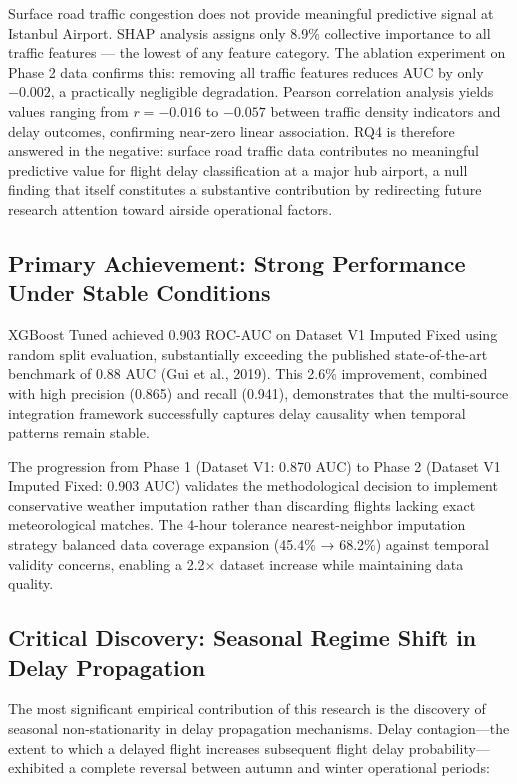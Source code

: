 \documentclass{report}
\begin{document}
Surface road traffic congestion does not provide meaningful predictive signal at Istanbul
Airport. SHAP analysis assigns only 8.9\% collective importance to all traffic features ---
the lowest of any feature category. The ablation experiment on Phase 2 data confirms this:
removing all traffic features reduces AUC by only $-0.002$, a practically negligible
degradation. Pearson correlation analysis yields values ranging from $r = -0.016$ to $-0.057$
between traffic density indicators and delay outcomes, confirming near-zero linear association.
RQ4 is therefore answered in the negative: surface road traffic data contributes no meaningful
predictive value for flight delay classification at a major hub airport, a null finding that
itself constitutes a substantive contribution by redirecting future research attention toward
airside operational factors.




\subsection{Primary Achievement: Strong Performance Under Stable Conditions}

XGBoost Tuned achieved 0.903 ROC-AUC on Dataset V1 Imputed Fixed using random split evaluation, substantially exceeding the published state-of-the-art benchmark of 0.88 AUC (Gui et al., 2019). This 2.6\% improvement, combined with high precision (0.865) and recall (0.941), demonstrates that the multi-source integration framework successfully captures delay causality when temporal patterns remain stable.

The progression from Phase 1 (Dataset V1: 0.870 AUC) to Phase 2 (Dataset V1 Imputed Fixed: 0.903 AUC) validates the methodological decision to implement conservative weather imputation rather than discarding flights lacking exact meteorological matches. The 4-hour tolerance nearest-neighbor imputation strategy balanced data coverage expansion (45.4\% → 68.2\%) against temporal validity concerns, enabling a 2.2× dataset increase while maintaining data quality.

\subsection{Critical Discovery: Seasonal Regime Shift in Delay Propagation}

The most significant empirical contribution of this research is the discovery of seasonal non-stationarity in delay propagation mechanisms. Delay contagion—the extent to which a delayed flight increases subsequent flight delay probability—exhibited a complete reversal between autumn and winter operational periods:
\end{document}
